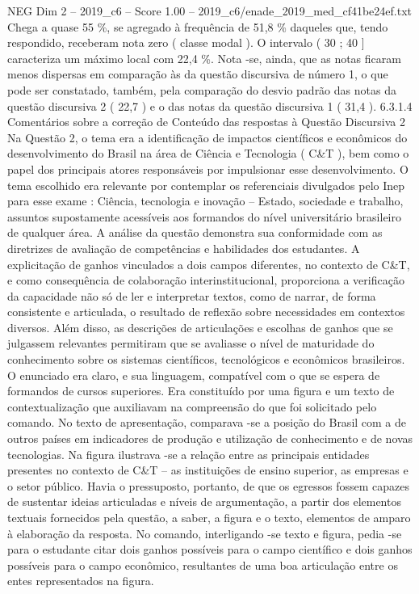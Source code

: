 \begin{textsample}{NEG Dim 2 – 2019\_c6 – Score 1.00 – 2019\_c6/enade\_2019\_med\_cf41be24ef.txt}
Chega a quase 55 \%, se agregado à frequência de 51,8 \% daqueles que, tendo respondido, receberam nota zero ( classe modal ).
O intervalo ( 30 ; 40 ] caracteriza um máximo local com 22,4 \%.
Nota -se, ainda, que as notas ficaram menos dispersas em comparação às da questão discursiva de número 1, o que pode ser constatado, também, pela comparação do desvio padrão das notas da questão discursiva 2 ( 22,7 ) e o das notas da questão discursiva 1 ( 31,4 ). 6.3.1.4 Comentários sobre a correção de Conteúdo das respostas à Questão Discursiva 2 Na Questão 2, o tema era a identificação de impactos científicos e econômicos do desenvolvimento do Brasil na área de Ciência e Tecnologia ( C\&T ), bem como o papel dos principais atores responsáveis por impulsionar esse desenvolvimento.
O tema escolhido era relevante por contemplar os referenciais divulgados pelo Inep para esse exame : Ciência, tecnologia e inovação – Estado, sociedade e trabalho, assuntos supostamente acessíveis aos formandos do nível universitário brasileiro de qualquer área.
A análise da questão demonstra sua conformidade com as diretrizes de avaliação de competências e habilidades dos estudantes.
A explicitação de ganhos vinculados a dois campos diferentes, no contexto de C\&T, e como consequência de colaboração interinstitucional, proporciona a verificação da capacidade não só de ler e interpretar textos, como de narrar, de forma consistente e articulada, o resultado de reflexão sobre necessidades em contextos diversos.
Além disso, as descrições de articulações e escolhas de ganhos que se julgassem relevantes permitiram que se avaliasse o nível de maturidade do conhecimento sobre os sistemas científicos, tecnológicos e econômicos brasileiros.
O enunciado era claro, e sua linguagem, compatível com o que se espera de formandos de cursos superiores.
Era constituído por uma figura e um texto de contextualização que auxiliavam na compreensão do que foi solicitado pelo comando.
No texto de apresentação, comparava -se a posição do Brasil com a de outros países em indicadores de produção e utilização de conhecimento e de novas tecnologias.
Na figura ilustrava -se a relação entre as principais entidades presentes no contexto de C\&T – as instituições de ensino superior, as empresas e o setor público.
Havia o pressuposto, portanto, de que os egressos fossem capazes de sustentar ideias articuladas e níveis de argumentação, a partir dos elementos textuais fornecidos pela questão, a saber, a figura e o texto, elementos de amparo à elaboração da resposta.
No comando, interligando -se texto e figura, pedia -se para o estudante citar dois ganhos possíveis para o campo científico e dois ganhos possíveis para o campo econômico, resultantes de uma boa articulação entre os entes representados na figura.

\end{textsample}
